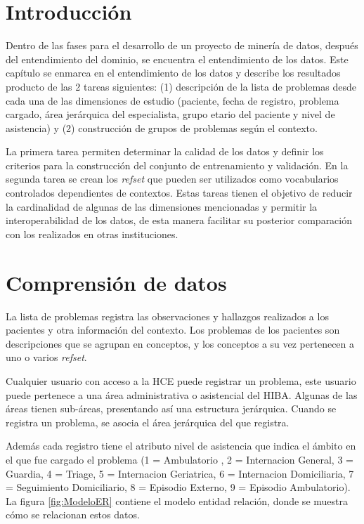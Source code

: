 \section{Introducción}
Dentro de las fases para el desarrollo de un proyecto de minería de datos, después del entendimiento del dominio, se encuentra el entendimiento de los datos. Este capítulo se enmarca en el entendimiento de los datos y describe los resultados producto de las 2 tareas siguientes: (1) descripción de la lista de problemas desde cada una de las dimensiones de estudio (paciente, fecha de registro, problema cargado, área jerárquica del especialista, grupo etario del paciente y nivel de asistencia) y (2) construcción de grupos de problemas según el contexto. 

La primera tarea permiten determinar la calidad de los datos y definir los criterios para la construcción del conjunto de entrenamiento y validación. En la segunda tarea se crean los \textit{\acrshort{refset}} que pueden ser utilizados como vocabularios controlados dependientes de contextos. Estas tareas  tienen el objetivo de reducir la cardinalidad de algunas de las dimensiones mencionadas y permitir la interoperabilidad de los datos, de esta manera facilitar su posterior comparación con los realizados en otras instituciones.

\section{Comprensión de datos}
La lista de problemas registra las observaciones y hallazgos realizados a los pacientes y otra información del contexto. Los problemas de los pacientes son descripciones que se agrupan en conceptos, y los conceptos a su vez pertenecen a uno o varios \textit{\acrshort{refset}}.

Cualquier usuario con acceso a la \acrshort{HCE} puede registrar un problema, este usuario puede pertenece a una área administrativa o asistencial del \acrshort{HIBA}. Algunas de las áreas tienen sub-áreas, presentando así una estructura jerárquica. Cuando se registra un problema, se asocia el área jerárquica del que registra.

Además cada registro tiene el atributo nivel de asistencia que indica el ámbito en el que fue cargado el problema (1 = Ambulatorio , 2 = Internacion General, 3 = Guardia, 4 = Triage, 5 = Internacion Geriatrica, 6 = Internacion Domiciliaria, 7 = Seguimiento Domiciliario, 8 = Episodio Externo, 9 = Episodio Ambulatorio). La figura \ref{fig:ModeloER} contiene el modelo entidad relación, donde se muestra cómo se relacionan estos datos.

